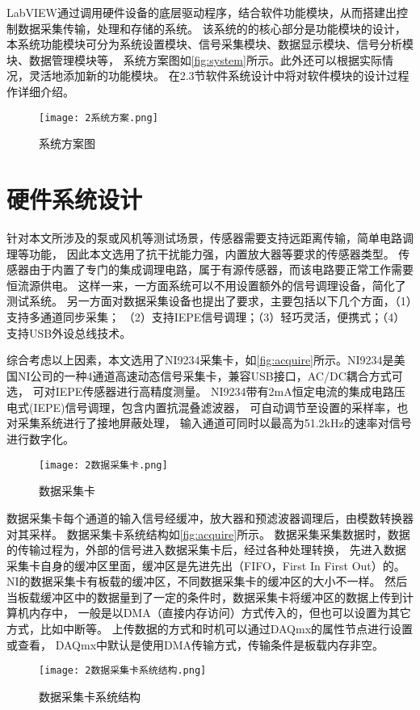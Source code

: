 LabVIEW通过调用硬件设备的底层驱动程序，结合软件功能模块，从而搭建出控制数据采集传输，处理和存储的系统。
该系统的的核心部分是功能模块的设计，本系统功能模块可分为系统设置模块、信号采集模块、数据显示模块、信号分析模块、数据管理模块等，
系统方案图如\autoref{fig:system}所示。此外还可以根据实际情况，灵活地添加新的功能模块。
在2.3节软件系统设计中将对软件模块的设计过程作详细介绍。
\begin{figure}[htbp]
    \centering
    \texttt{[image: 2系统方案.png]}
    \caption{\label{fig:system}系统方案图}
\end{figure}

\section{硬件系统设计}
针对本文所涉及的泵或风机等测试场景，传感器需要支持远距离传输，简单电路调理等功能，
因此本文选用了抗干扰能力强，内置放大器等要求的传感器类型。
传感器由于内置了专门的集成调理电路，属于有源传感器，而该电路要正常工作需要恒流源供电。
这样一来，一方面系统可以不用设置额外的信号调理设备，简化了测试系统。
另一方面对数据采集设备也提出了要求，主要包括以下几个方面，（1）支持多通道同步采集；
（2）支持IEPE信号调理；（3）轻巧灵活，便携式；（4）支持USB外设总线技术。

综合考虑以上因素，本文选用了​NI9234采集卡，如\autoref{fig:acquire}所示。
​NI9234是美国NI公司的一种4通道高速动态信号采集卡，兼容USB接口，AC/DC耦合方式可选，
可对IEPE传感器进行高精度测量。
NI9234带有2mA恒定电流的集成电路压电式(IEPE)信号调理，包含内置抗混叠滤波器，
可自动调节至设置的采样率，也对采集系统进行了接地屏蔽处理，
输入通道可同时以最高为51.2$\mathrm{kHz}$的速率对信号进行数字化。
\begin{figure}[htbp]
    \centering
    \texttt{[image: 2数据采集卡.png]}
    \caption{\label{fig:acquire}数据采集卡}
\end{figure}
​
数据采集卡每个通道的输入信号经缓冲，放大器和预滤波器调理后，由模数转换器对其采样。
数据采集卡系统结构如\autoref{fig:acquire}所示。
数据采集采集数据时，数据的传输过程为，外部的信号进入数据采集卡后，经过各种处理转换，
先进入数据采集卡自身的缓冲区里面，缓冲区是先进先出（FIFO，First In First Out）的。
NI的数据采集卡有板载的缓冲区，不同数据采集卡的缓冲区的大小不一样。
然后当板载缓冲区中的数据量到了一定的条件时，数据采集卡将缓冲区的数据上传到计算机内存中，
一般是以DMA（直接内存访问）方式传入的，但也可以设置为其它方式，比如中断等。
上传数据的方式和时机可以通过DAQmx的属性节点进行设置或查看，
DAQmx中默认是使用DMA传输方式，传输条件是板载内存非空。
\begin{figure}[htbp]
    \centering
    \texttt{[image: 2数据采集卡系统结构.png]}
    \caption{\label{fig:acquire}数据采集卡系统结构}
\end{figure}

